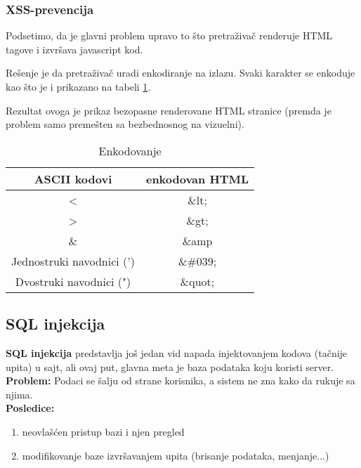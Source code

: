 \documentclass[a4paper]{article}
\begin{document}
\subsubsection{XSS-prevencija}
Podsetimo, da je glavni problem upravo to \v{s}to pretra\v{z}iva\v{c} renderuje HTML tagove i izvr\v{s}ava javascript kod.  

Re\v{s}enje je da pretra\v{z}iva\v{c} uradi enkodiranje na izlazu. Svaki karakter se enkoduje kao \v{s}to je i prikazano na tabeli \ref{kodiranje}.

Rezultat ovoga je prikaz bezopasne renderovane HTML stranice (premda je problem samo preme\v{s}ten sa bezbednosnog na vizuelni).

\begin{table}[ht]

\begin{center}
\caption{Enkodovanje}
\begin{tabular}{ | c | c | }
\hline
	\rowcolor{yellow}
\textbf{ASCII kodovi} & \textbf{enkodovan HTML} \\
	\hline
 < & \&lt; \\ 
 \hline
 > & \&gt; \\  
 \hline
 \& & \&amp \\
 \hline
 Jednostruki navodnici (') & \&\#039;\\
 \hline
 Dvostruki navodnici (") & \&quot;\\  
 \hline  
\end{tabular}

\label{kodiranje}
\end{center}
\end{table}

\subsection{SQL injekcija}
\textbf{SQL injekcija} predstavlja jo\v{s} jedan vid napada injektovanjem kodova (ta\v{c}nije upita) u sajt, ali ovaj put, glavna meta je baza podataka koju koristi server.\\
\textbf{Problem:} Podaci se \v{s}alju od strane korisnika, a sistem ne zna kako da rukuje sa njima.\\
\textbf{Posledice:} 
\begin{enumerate}
	\item neovla\v{s}\'{c}en pristup bazi i njen pregled
	\item modifikovanje baze izvr\v{s}avanjem upita (brisanje podataka, menjanje...)
\end{enumerate}
\end{document}
